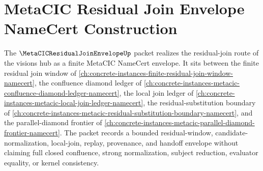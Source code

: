 \chapter{MetaCIC Residual Join Envelope NameCert Construction}
\label{ch:concrete-instances-metacic-residual-join-envelope-namecert}

The $\MetaCICResidualJoinEnvelopeUp$ packet realizes the residual-join route of the visions hub as a finite MetaCIC NameCert envelope. It sits between the finite residual join window of \autoref{ch:concrete-instances-finite-residual-join-window-namecert}, the confluence diamond ledger of \autoref{ch:concrete-instances-metacic-confluence-diamond-ledger-namecert}, the local join ledger of \autoref{ch:concrete-instances-metacic-local-join-ledger-namecert}, the residual-substitution boundary of \autoref{ch:concrete-instances-metacic-residual-substitution-boundary-namecert}, and the parallel-diamond frontier of \autoref{ch:concrete-instances-metacic-parallel-diamond-frontier-namecert}. The packet records a bounded residual-window, candidate-normalization, local-join, replay, provenance, and handoff envelope without claiming full closed confluence, strong normalization, subject reduction, evaluator equality, or kernel consistency.

